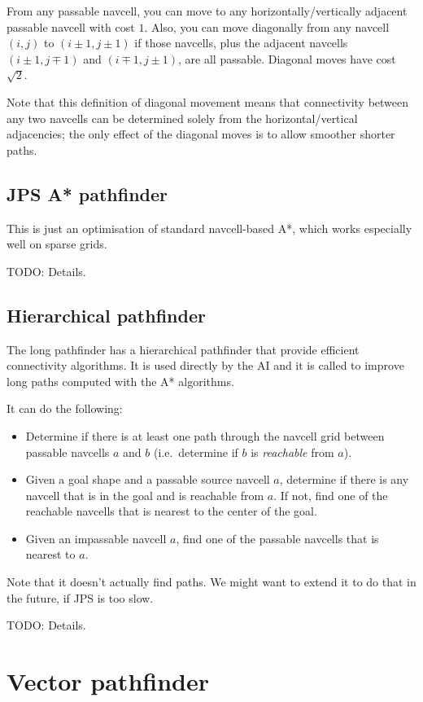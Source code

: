 \documentclass[a4paper,10pt]{article}
\begin{document}
From any passable navcell, you can move to any horizontally/vertically adjacent
passable navcell with cost $1$.
Also, you can move diagonally from any navcell $(i,j)$ to $(i\pm1,j\pm1)$
if those navcells,
plus the adjacent navcells $(i\pm1,j\mp1)$ and $(i\mp1,j\pm1)$,
are all passable.
Diagonal moves have cost $\sqrt{2}$.

Note that this definition of diagonal movement
means that connectivity between any two navcells
can be determined solely from the horizontal/vertical adjacencies;
the only effect of the diagonal moves is to allow smoother shorter paths.

\subsection{JPS A* pathfinder}

This is just an optimisation of standard navcell-based A*,
which works especially well on sparse grids.

TODO: Details.

\subsection{Hierarchical pathfinder}

The long pathfinder has a hierarchical pathfinder that provide efficient connectivity algorithms. It is used directly by the AI and it is called to improve long paths computed with the A* algorithms.

It can do the following:
\begin{itemize}
 \item Determine if there is at least one path through the navcell grid between
 passable navcells $a$ and $b$ (i.e.\ determine if $b$ is \emph{reachable} from $a$).
 \item Given a goal shape and a passable source navcell $a$,
 determine if there is any navcell that is in the goal and is reachable from $a$.
 If not, find one of the reachable navcells that is nearest to the center of the goal.
 \item Given an impassable navcell $a$, find one of the passable navcells that is
 nearest to $a$.
\end{itemize}

Note that it doesn't actually find paths.
We might want to extend it to do that in the future,
if JPS is too slow.

TODO: Details.

\section{Vector pathfinder}
\end{document}
